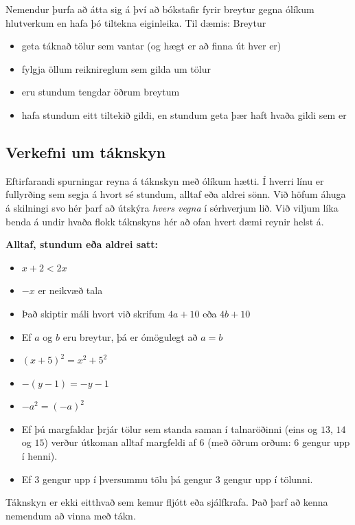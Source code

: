 \documentclass[
  icelandic,
]{book}
\providecommand{\tightlist}{%
  \setlength{\itemsep}{0pt}\setlength{\parskip}{0pt}}
\begin{document}
Nemendur þurfa að átta sig á því að bókstafir fyrir breytur gegna ólíkum hlutverkum en hafa þó tiltekna eiginleika. Til dæmis: Breytur

\begin{itemize}
\tightlist
\item
  geta táknað tölur sem vantar (og hægt er að finna út hver er)
\item
  fylgja öllum reiknireglum sem gilda um tölur
\item
  eru stundum tengdar öðrum breytum
\item
  hafa stundum eitt tiltekið gildi, en stundum geta þær haft hvaða gildi sem er
\end{itemize}

\subsection{Verkefni um táknskyn}\label{verkefni-taknskyn}

Eftirfarandi spurningar reyna á táknskyn með ólíkum hætti. Í hverri línu er fullyrðing sem segja á hvort sé stundum, alltaf eða aldrei sönn. Við höfum áhuga á skilningi svo hér þarf að útskýra \emph{hvers vegna} í sérhverjum lið. Við viljum líka benda á undir hvaða flokk táknskyns hér að ofan hvert dæmi reynir helst á.

\textbf{Alltaf, stundum eða aldrei satt:}

\begin{itemize}
\tightlist
\item
  \(x+2 < 2x\)
\item
  \(-x\) er neikvæð tala
\item
  Það skiptir máli hvort við skrifum \(4a+10\) eða \(4b+10\)
\item
  Ef \(a\) og \(b\) eru breytur, þá er ómögulegt að \(a=b\)
\item
  \((x+5)^2 = x^2 + 5^2\)
\item
  \(-(y-1) = -y -1\)
\item
  \(-a^2 = (-a)^2\)
\item
  Ef þú margfaldar þrjár tölur sem standa saman í talnaröðinni (eins og \(13\), \(14\) og \(15\)) verður útkoman alltaf margfeldi af \(6\) (með öðrum orðum: \(6\) gengur upp í henni).
\item
  Ef \(3\) gengur upp í þversummu tölu þá gengur \(3\) gengur upp í tölunni.
\end{itemize}

Táknskyn er ekki eitthvað sem kemur fljótt eða sjálfkrafa. Það þarf að kenna nemendum að vinna með tákn.
\end{document}
